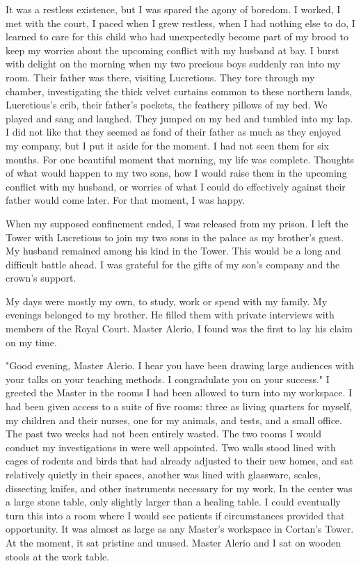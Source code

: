 \documentclass{article}
\begin{document}
It was a restless existence, but I was spared the agony of boredom. I worked, I met with the court, I paced when I grew restless, when I had nothing else to do, I learned to care for this child who had unexpectedly become part of my brood to keep my worries about the upcoming conflict with my husband at bay. I burst with delight on the morning when my two precious boys suddenly ran into my room. Their father was there, visiting Lucretious. They tore through my chamber, investigating the thick velvet curtains common to these northern lands, Lucretious's crib, their father's pockets, the feathery pillows of my bed. We played and sang and laughed. They jumped on my bed and tumbled into my lap. I did not like that they seemed as fond of their father as much as they enjoyed my company, but I put it aside for the moment. I had not seen them for six months. For one beautiful moment that morning, my life was complete. Thoughts of what would happen to my two sons, how I would raise them in the upcoming conflict with my husband, or worries of what I could do effectively against their father would come later. For that moment, I was happy.

\vspace{.5cm}

When my supposed confinement ended, I was released from my prison. I left the Tower with Lucretious to join my two sons in the palace as my brother's guest. My husband remained among his kind in the Tower. This would be a long and difficult battle ahead. I was grateful for the gifts of my son's company and the crown's support.

My days were mostly my own, to study, work or spend with my family. My evenings belonged to my brother. He filled them with private interviews with members of the Royal Court. Master Alerio, I found was the first to lay his claim on my time. 

"Good evening, Master Alerio. I hear you have been drawing large audiences with your talks on your teaching methods. I congradulate you on your success." I greeted the Master in the rooms I had been allowed to turn into my workspace. I had been given access to a suite of five rooms: three as living quarters for myself, my children and their nurses, one for my animals, and tests, and a small office. The past two weeks had not been entirely wasted. The two rooms I would conduct my investigations in were well appointed. Two walls stood lined with cages of rodents and birds that had already adjusted to their new homes, and sat relatively quietly in their spaces, another was lined with glassware, scales, dissecting knifes, and other instruments necessary for my work. In the center was a large stone table, only slightly larger than a healing table. I could eventually turn this into a room where I would see patients if circumstances provided that opportunity. It was almost as large as any Master's workspace in Cortan's Tower. At the moment, it sat pristine and unused. Master Alerio and I sat on wooden stools at the work table.
\end{document}
